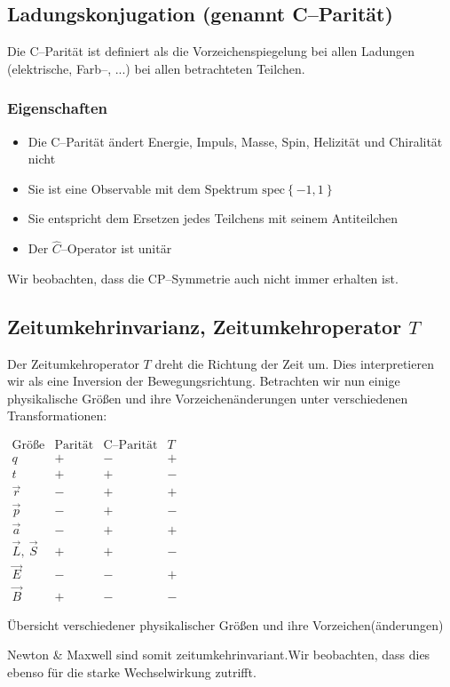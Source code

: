 \documentclass[Ex4_Zusammenfassung.tex]{subfiles}
\begin{document}

\subsection{Ladungskonjugation (genannt C--Parität)}
Die C--Parität ist definiert als die Vorzeichenspiegelung bei allen Ladungen (elektrische, Farb--, ...) bei allen betrachteten Teilchen. 

\subsubsection{Eigenschaften}
\begin{itemize}
	\item Die C--Parität ändert Energie, Impuls, Masse, Spin, Helizität und Chiralität nicht
	\item Sie ist eine Observable mit dem Spektrum $\mathrm{spec}\left\{ -1, 1\right\}$
	\item Sie entspricht dem Ersetzen jedes Teilchens mit seinem Antiteilchen
	\item Der $\hat{C}$--Operator ist unitär
\end{itemize}
Wir beobachten, dass die CP--Symmetrie auch nicht immer erhalten ist. 

\subsection{Zeitumkehrinvarianz, Zeitumkehroperator $T$}
Der Zeitumkehroperator $T$ dreht die Richtung der Zeit um. Dies interpretieren wir als eine Inversion der Bewegungsrichtung. Betrachten wir nun einige physikalische Größen und ihre Vorzeichenänderungen unter verschiedenen Transformationen:
\begin{table}[H]
	\centering
	$
	\begin{array}{cccc}
	\text{Größe} & \text{Parität} & \text{C--Parität} & T \\ \hline
	q & + & - & + \\ 
	t & + & + & - \\ 
	\vec{r} & - & + & + \\ 
	\vec{p} & - & + & - \\ 
	\vec{a} & - & + & + \\ 
	\vec{L},\ \vec{S} & + & + & - \\ 
	\vec{E} & - & - & + \\ 
	\vec{B} & + & - & -
	\end{array}  
	$
	\caption{Übersicht verschiedener physikalischer Größen und ihre Vorzeichen(änderungen)}
\end{table}
Newton \& Maxwell sind somit zeitumkehrinvariant.Wir beobachten, dass dies ebenso für die starke Wechselwirkung zutrifft.\\
\end{document}

